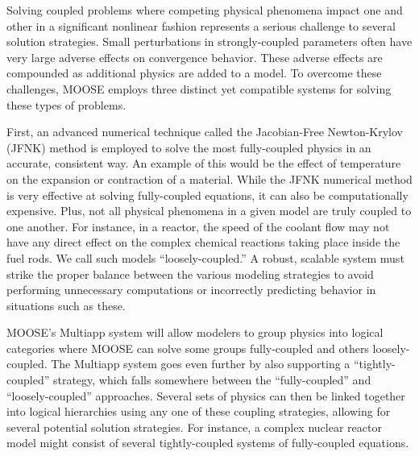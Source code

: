 \documentclass{INLreport}
\begin{document}
Solving coupled problems where competing physical phenomena impact one and other in a significant nonlinear fashion represents a
serious challenge to
several solution strategies. Small perturbations in strongly-coupled parameters often have very large adverse effects on
convergence behavior. These adverse effects are compounded as additional physics are added to a model. To overcome these
challenges, MOOSE employs three distinct yet compatible systems for solving these types of problems.

First, an advanced numerical technique called the Jacobian-Free Newton-Krylov (JFNK) method is employed to solve the most fully-coupled physics
in an accurate, consistent way. An example of this would be the effect of temperature on the expansion or contraction of a
material. While the JFNK numerical method is very effective at solving fully-coupled equations, it can also be computationally
expensive. Plus, not all physical phenomena in a given model are truly coupled to one another. For instance, in a reactor, the
speed of the coolant flow may not have any direct effect on the complex chemical reactions taking place inside the fuel rods.
We call such models “loosely-coupled.” A robust, scalable system must strike the proper balance between the various modeling
strategies to avoid performing unnecessary computations or incorrectly predicting behavior in situations such as these.

MOOSE’s Multiapp system will allow modelers to group physics into logical categories where MOOSE can solve some groups
fully-coupled and others loosely-coupled. The Multiapp system goes even further by also supporting a “tightly-coupled”
strategy, which falls somewhere between the “fully-coupled” and “loosely-coupled” approaches. Several sets of physics can then
be linked together into logical hierarchies using any one of these coupling strategies, allowing for several potential solution
strategies. For instance, a complex nuclear reactor model might consist of several tightly-coupled systems of fully-coupled
equations.
\end{document}
